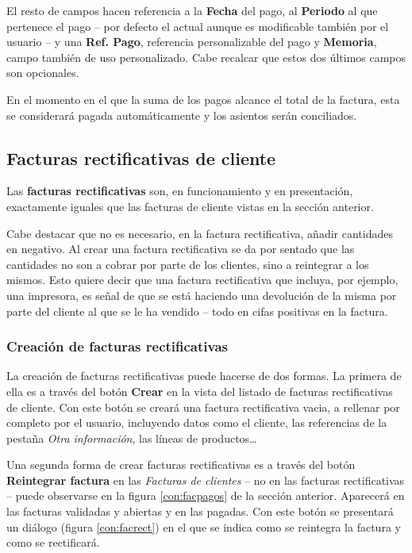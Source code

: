 El resto de campos hacen referencia a la \textbf{Fecha} del pago, al \textbf{Periodo} al que pertenece el pago -- por defecto el actual aunque es modificable también por el usuario -- y una \textbf{Ref. Pago}, referencia personalizable del pago  y \textbf{Memoria}, campo también de uso personalizado. Cabe recalcar que estos dos últimos campos son opcionales.

En el momento en el que la suma de los pagos alcance el total de la factura, esta se considerará pagada automáticamente y los asientos serán conciliados.




\subsection{Facturas rectificativas de cliente}

Las \textbf{facturas rectificativas} son, en funcionamiento y en presentación, exactamente iguales que las facturas de cliente vistas en la sección anterior.

Cabe destacar que no es necesario, en la factura rectificativa, añadir cantidades en negativo. Al crear una factura rectificativa se da por sentado que las cantidades no son a cobrar por parte de los clientes, sino a reintegrar a los mismos. Esto quiere decir que una factura rectificativa que incluya, por ejemplo, una impresora, es señal de que se está haciendo una devolución de la misma por parte del cliente al que se le ha vendido -- todo en cifas positivas en la factura.

\subsubsection{Creación de facturas rectificativas}

La creación de facturas rectificativas puede hacerse de dos formas. La primera de ella es a través del botón \textbf{Crear} en la vista del listado de facturas rectificativas de cliente. Con este botón se creará una factura rectificativa vacia, a rellenar por completo por el usuario, incluyendo datos como el cliente, las referencias de la pestaña \emph{Otra información}, las líneas de productos\ldots

Una segunda forma de crear facturas rectificativas es a través del botón \textbf{Reintegrar factura} en las \emph{Facturas de clientes} -- no en las facturas rectificativas -- puede observarse en la figura \ref{con:facpagos} de la sección anterior. Aparecerá en las facturas validadas y abiertas y en las pagadas. Con este botón se presentará un diálogo (figura \ref{con:facrect}) en el que se indica como se reintegra la factura y como se rectificará.

